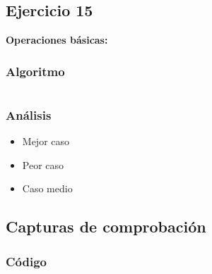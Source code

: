 \documentclass[12pt, letterpaper]{article}			%
\begin{document}
	    \subsection{Ejercicio 15}
	   	\textbf{Operaciones básicas:}
		
			\subsubsection{Algoritmo}
			    \begin{lstlisting}[style=Java]
    		    \end{lstlisting}

    		\subsubsection{Análisis}
	    		\begin{itemize}
	    			\item[\Checklist] Mejor caso \\

	    			\item[\Checklist] Peor caso \\
					
					\item[\Checklist] Caso medio \\

				\end{itemize}

	        \subsection{Capturas de comprobación}

	        \subsubsection{Código}
	            \begin{lstlisting}[style=Java]
    		    \end{lstlisting}
\end{document}
